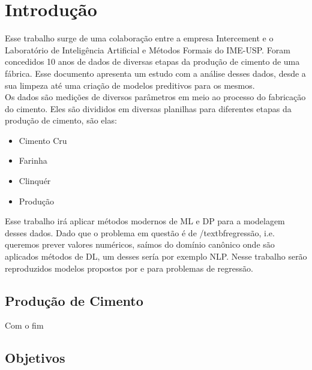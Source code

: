 \chapter{Introdução}
\label{cap:introducao}


Esse trabalho surge de uma colaboração entre a empresa Intercement e o Laboratório de Inteligência Artificial e Métodos Formais do IME-USP. Foram concedidos 10 anos de dados de diversas etapas da produção de cimento de uma fábrica. Esse documento apresenta um estudo com a análise desses dados, desde a sua limpeza até uma criação de modelos preditivos para os mesmos. \\

Os dados são medições de diversos parâmetros em meio ao processo do fabricação do cimento. Eles são divididos em diversas planilhas para diferentes etapas da produção de cimento, são elas:

\begin{itemize}


        \item Cimento Cru
        \item Farinha
        \item Clinquér
        \item Produção

\end{itemize}


Esse trabalho irá aplicar métodos modernos de ML e DP para a modelagem desses dados. Dado que o problema em questão é de /textbf{regressão}, i.e. queremos prever valores numéricos, saímos do domínio canônico onde são aplicados métodos de DL, um desses sería por exemplo NLP. Nesse trabalho serão reproduzidos modelos propostos por \citet{ubertime} e \citet{energylstm} para problemas de regressão.



\section{Produção de Cimento}
\label{sec:producao}

Com o fim  

\section{Objetivos}
\label{sec:objetivo}

